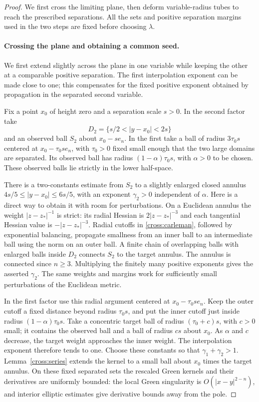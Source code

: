 \begin{proof}
We first cross the limiting plane, then deform variable-radius tubes
to reach the prescribed separations.  All the sets and positive
separation margins used in the two steps are fixed before choosing
$\lambda$.

\paragraph{Crossing the plane and obtaining a common seed.}
We first extend slightly across the plane in one variable while keeping
the other at a comparable positive separation. The first interpolation
exponent can be made close to one; this compensates for the fixed
positive exponent obtained by propagation in the separated second
variable.

Fix a point $x_0$ of height zero and a separation scale $s>0$.
In the second factor take
\[
 D_2=\{s/2<|y-x_0|<2s\}
\]
and an observed ball $S_2$ about $x_0-se_n$.
In the first take a ball of radius $3\tau_0s$ centered at
$x_0-\tau_0se_n$, with $\tau_0>0$ fixed small enough that the two
large domains are separated.  Its observed ball has radius
$(1-\alpha)\tau_0s$, with $\alpha>0$ to be chosen.
These observed balls lie strictly in the lower half-space.

There is a two-constants estimate from $S_2$ to a slightly enlarged
closed annulus $4s/5\le|y-x_0|\le6s/5$, with an exponent
$\gamma_2>0$ independent of $\alpha$.  Here is a direct way to obtain
it with room for perturbations.  On a Euclidean annulus the weight
$|z-z_*|^{-1}$ is strict: its radial Hessian is
$2|z-z_*|^{-3}$ and each tangential Hessian value is
$-|z-z_*|^{-3}$.  Radial cutoffs in
\eqref{cross:carleman}, followed by exponential balancing, propagate
smallness from an inner ball to an intermediate ball using the norm
on an outer ball.  A finite chain of overlapping balls with enlarged
balls inside $D_2$ connects $S_2$ to the target annulus.  The annulus
is connected since $n\ge3$.  Multiplying the finitely many positive
exponents gives the asserted $\gamma_2$.  The same weights and margins
work for sufficiently small perturbations of the Euclidean metric.

In the first factor use this radial argument centered at
$x_0-\tau_0se_n$.  Keep the outer cutoff a fixed distance beyond radius
$\tau_0s$, and put the inner cutoff just inside radius
$(1-\alpha)\tau_0s$.  Take a concentric target ball of radius
$(\tau_0+c)s$, with $c>0$ small; it contains the observed ball and
a ball of radius $cs$ about $x_0$.
As $\alpha$ and $c$ decrease, the target weight approaches the inner weight.
The interpolation exponent therefore tends to one.  Choose these
constants so that $\gamma_1+\gamma_2>1$.
Lemma~\ref{cross:series} extends the kernel to a small ball about
$x_0$ times the target annulus.  On these fixed separated sets the
rescaled Green kernels and their derivatives are uniformly bounded:
the local Green singularity is $O(|x-y|^{2-n})$, and interior elliptic
estimates give derivative bounds away from the pole.


\end{proof}
